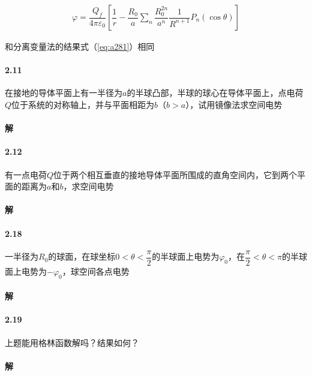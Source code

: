\documentclass{article}
\begin{document}
\begin{equation*}
  \begin{aligned}
    \varphi = \dfrac{Q_f}{4\pi \varepsilon_0} \left[ \dfrac{1}{r} - \dfrac{R_0}{a} \sum_n \dfrac{R_0^{2n}}{a^n} \dfrac{1}{R^{n+1}} P_n \left( \cos \theta \right)  \right]
  \end{aligned}
\end{equation*}

和分离变量法的结果式（\ref{eq:a281}）相同

\paragraph{2.11}

在接地的导体平面上有一半径为$a$的半球凸部，半球的球心在导体平面上，点电荷$Q$位于系统的对称轴上，并与平面相距为$b$（$b>a$），试用镜像法求空间电势

\paragraph{解}




\paragraph{2.12}

有一点电荷$Q$位于两个相互垂直的接地导体平面所围成的直角空间内，它到两个平面的距离为$a$和$b$，求空间电势

\paragraph{解}




\paragraph{2.18}

一半径为$R_0$的球面，在球坐标$0<\theta< \dfrac{\pi}{2} $的半球面上电势为$\varphi_0$，在$\dfrac{\pi}{2} < \theta < \pi $的半球面上电势为$-\varphi_0$，球空间各点电势

\paragraph{解}




\paragraph{2.19}

上题能用格林函数解吗？结果如何？

\paragraph{解}
\end{document}
